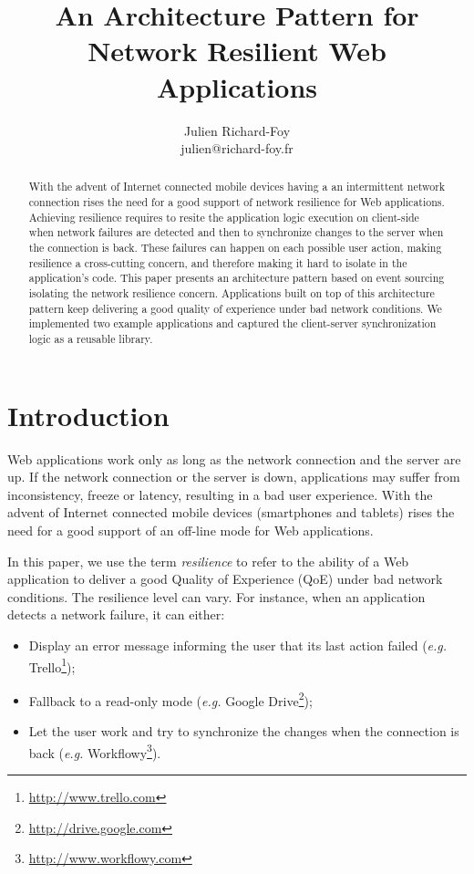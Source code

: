 \documentclass{llncs}
\begin{document}
\title{An Architecture Pattern for Network Resilient Web Applications}

\author{Julien Richard-Foy\\julien@richard-foy.fr}


\maketitle

\begin{abstract}
With the advent of Internet connected mobile devices having a an intermittent network connection rises the need for a good support of network resilience for Web applications. Achieving resilience requires to resite the application logic execution on client-side when network failures are detected and then to synchronize changes to the server when the connection is back. These failures can happen on each possible user action, making resilience a cross-cutting concern, and therefore making it hard to isolate in the application's code. This paper presents an architecture pattern based on event sourcing isolating the network resilience concern. Applications built on top of this architecture pattern keep delivering a good quality of experience under bad network conditions. We implemented two example applications and captured the client-server synchronization logic as a reusable library.
\end{abstract}

\section{Introduction}

Web applications work only as long as the network connection and the server are up. If the network connection or the server is down, applications may suffer from inconsistency, freeze or latency, resulting in a bad user experience. With the advent of Internet connected mobile devices (smartphones and tablets) rises the need for a good support of an off-line mode for Web applications.

In this paper, we use the term \textit{resilience} to refer to the ability of a Web application to deliver a good Quality of Experience (QoE) under bad network conditions. The resilience level can vary. For instance, when an application detects a network failure, it can either:

\begin{itemize}
 \item Display an error message informing the user that its last action failed (\textit{e.g.} Trello\footnote{\href{http://www.trello.com}{http://www.trello.com}});
 \item Fallback to a read-only mode (\textit{e.g.} Google Drive\footnote{\href{http://drive.google.com}{http://drive.google.com}});
 \item Let the user work and try to synchronize the changes when the connection is back (\textit{e.g.} Workflowy\footnote{\href{http://www.workflowy.com}{http://www.workflowy.com}}).
\end{itemize}
\end{document}
